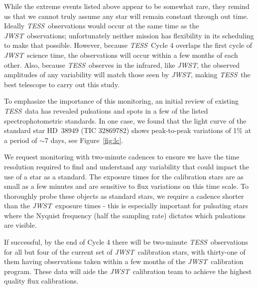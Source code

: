 \documentclass[letterpaper,12pt]{article}
\newcommand{\tess}{{\it TESS}}
\newcommand{\jwst}{{\it JWST}}
\begin{document}
While the extreme events listed above appear to be somewhat rare, they remind us that we cannot truly assume any star will remain constant through out time. Ideally \tess\ observations would occur at the same time as the \jwst\ observations; unfortunately neither mission has flexibility in its scheduling to make that possible. However, because \tess\ Cycle 4 overlaps the first cycle of \jwst\ science time, the observations will occur within a few months of each other. Also, because \tess\ observes in the infrared, like \jwst, the observed amplitudes of any variability will match those seen by \jwst, making \tess\ the best telescope to carry out this study.

To emphasize the importance of this monitoring, an initial review of existing \tess\ data has revealed pulsations and spots in a few of the listed spectrophotometric standards. In one case, we found that the light curve of the standard star HD~38949 (TIC 32869782) shows peak-to-peak variations of 1\% at a period of $\sim$7 days, see Figure~\ref{fig:lc}. 

We request monitoring with two-minute cadences to ensure we have the time resolution required to find and understand any variability that could impact the use of a star as a standard. The exposure times for the calibration stars are as small as a few minutes and are sensitive to flux variations on this time scale. To thoroughly probe these objects as standard stars, we require a cadence shorter than the \jwst\ exposure times - this is especially important for pulsating stars where the Nyquist frequency (half the sampling rate) dictates which pulsations are visible.

If successful, by the end of Cycle 4 there will be two-minute \tess\ observations for all but four of the current set of \jwst\ calibration stars, with thirty-one of them having observations taken within a few months of the \jwst\ calibration program. These data will aide the \jwst\ calibration team to achieve the highest quality flux calibrations.

\end{document}
